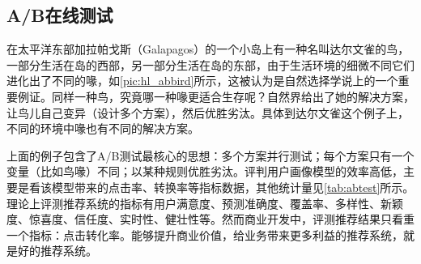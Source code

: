   \subsection{A/B在线测试}
  在太平洋东部加拉帕戈斯（Galapagos）的一个小岛上有一种名叫达尔文雀的鸟，一部分生活在岛的西部，另一部分生活在岛的东部，由于生活环境的细微不同它们进化出了不同的喙，如\autoref{pic:hl_abbird}所示，这被认为是自然选择学说上的一个重要例证。同样一种鸟，究竟哪一种喙更适合生存呢？自然界给出了她的解决方案，让鸟儿自己变异（设计多个方案），然后优胜劣汰。具体到达尔文雀这个例子上，不同的环境中喙也有不同的解决方案。
  \begin{figure}
  \centering
    \label{pic:hl_abbird}
  \end{figure}
  上面的例子包含了A/B测试最核心的思想：多个方案并行测试；每个方案只有一个变量（比如鸟喙）不同；以某种规则优胜劣汰。评判用户画像模型的效率高低，主要是看该模型带来的点击率、转换率等指标数据，其他统计量见\autoref{tab:abtest}所示。理论上评测推荐系统的指标有用户满意度、预测准确度、覆盖率、多样性、新颖度、惊喜度、信任度、实时性、健壮性等。然而商业开发中，评测推荐结果只看重一个指标：点击转化率。能够提升商业价值，给业务带来更多利益的推荐系统，就是好的推荐系统。
